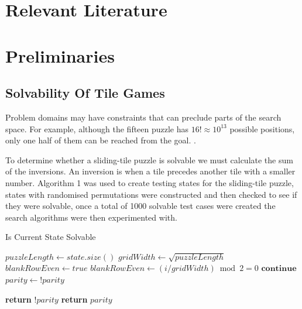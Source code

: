 \documentclass[final]{cmpreport}
\begin{document}
 
 

 


\section{Relevant Literature}


\section{Preliminaries}
\subsection{Solvability Of Tile Games}
Problem domains may have constraints that can preclude parts of the search space. For example, although the fifteen puzzle has $ 16! \approx 10^{13} $ possible positions, only one half of them can be reached from the goal. \citep{DBLP:journals/ci/CulbersonS98}. 

To determine whether a sliding-tile puzzle is solvable we must calculate the sum of the inversions.
An inversion is when a tile precedes another tile with a smaller number. 
Algorithm 1 was used to create testing states for the sliding-tile puzzle, states with randomised permutations were constructed and then checked to see if they were solvable, once a total of 1000 solvable test cases were created the search algorithms were then experimented with.
\begin{algorithm}
	\caption{Is Current State Solvable}\label{Solvable}
	\begin{algorithmic}[H]
		\State $puzzleLength \gets state.size()$
		\State 	$gridWidth \gets \sqrt{puzzleLength}$
		\State $blankRowEven \gets true$
		\State $blankRowEven \gets (i / gridWidth) \bmod 2 = 0$
		\State $\textbf{continue} $
		\State $parity \gets !parity$
		\EndIf
		\EndFor
		\EndIf 
		\EndFor
		
		\State \textbf{return} $!parity$
		\EndIf
		\State \textbf{return} $parity$
		
		\EndProcedure
	\end{algorithmic}	
\end{algorithm}	
\end{document}
